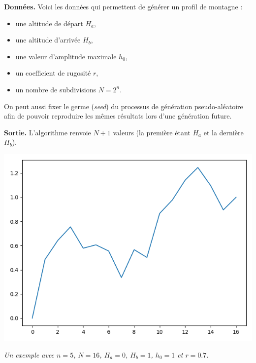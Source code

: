\documentclass[11pt,class=report,crop=false]{standalone}
\begin{document}
\textbf{Données.} Voici les données qui permettent de générer un profil de montagne :

\begin{itemize}
  \item une altitude de départ $H_a$,
  \item une altitude d'arrivée $H_b$, 
  \item une valeur d'amplitude maximale $h_0$,
  \item un coefficient de rugosité $r$,
  \item un nombre de subdivisions $N = 2^n$.
\end{itemize}

On peut aussi fixer le germe (\emph{seed}) du processus de génération pseudo-aléatoire afin de pouvoir reproduire les mêmes résultats lors d'une génération future.

\medskip

\textbf{Sortie.}
L'algorithme renvoie $N+1$ valeurs (la première étant $H_a$ et la dernière $H_b$).


\begin{center}
\includegraphics[scale=\myscale,scale=0.5]{figures/landscape-02}

\nopagebreak

\begin{minipage}{0.8\textwidth}
\center\emph{
Un exemple avec $n=5$, $N=16$, $H_a=0$, $H_b=1$, $h_0=1$ et $r=0.7$.}
\end{minipage}

\end{center}

\medskip
\end{document}
